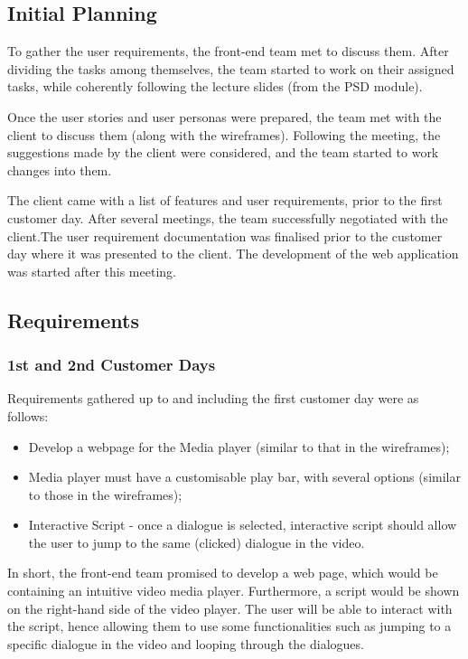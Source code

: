 \documentclass{l3proj}
\begin{document}
\subsection{Initial Planning}

To gather the user requirements, the front-end team met to discuss them. After dividing the tasks among themselves, the team started to work on their assigned tasks, while coherently following the lecture slides (from the PSD module).

Once the user stories and user personas were prepared, the team met with the client to discuss them (along with the wireframes). Following the meeting, the suggestions made by the client were considered, and the team started to work changes into them.

The client came with a list of features and user requirements, prior to the first customer day. After several meetings, the team successfully negotiated with the client.The user requirement documentation was finalised prior to the customer day where it was presented to the client. The development of the web application was started after this meeting.

\subsection{Requirements}

\subsubsection{1st and 2nd Customer Days}

Requirements gathered up to and including the first customer day were as follows:  

\begin{itemize}
\item Develop a webpage for the Media player (similar to that in the wireframes);
\item Media player must have a customisable play bar, with several options (similar to those in the wireframes);
\item Interactive Script - once a dialogue is selected, interactive script should allow the user to jump to the same (clicked) dialogue in the video. 
\end{itemize} 

In short, the front-end team promised to develop a web page, which would be containing an intuitive video media player. Furthermore, a script would be shown on the right-hand side of the video player. The user will be able to interact with the script, hence allowing them to use some functionalities such as jumping to a specific dialogue in the video and looping through the dialogues.   
\end{document}
